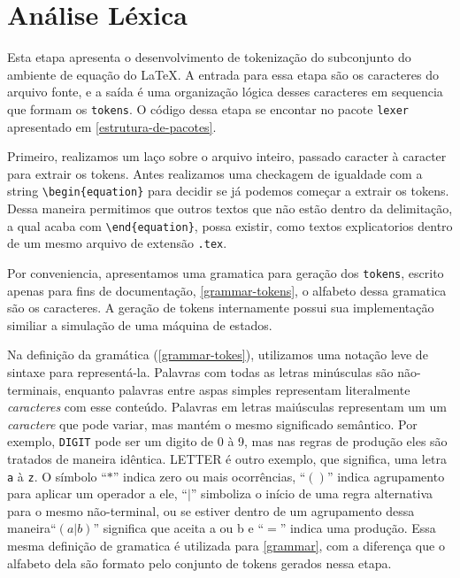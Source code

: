 
\section{Análise Léxica}
Esta etapa apresenta o desenvolvimento de tokenização do subconjunto do ambiente de equação do \LaTeX{}. A entrada para essa etapa são os caracteres do arquivo fonte, e a saída é uma organização lógica desses caracteres em sequencia que formam os \texttt{tokens}. O código dessa etapa se encontar no pacote \texttt{lexer} apresentado em \autoref{estrutura-de-pacotes}.

Primeiro, realizamos um laço sobre o arquivo inteiro, passado caracter à caracter para extrair os tokens. Antes realizamos uma checkagem de igualdade com a string
\verb|\begin{equation}| para decidir se já podemos começar a extrair os tokens. Dessa maneira permitimos que outros textos que não estão dentro da delimitação, a qual acaba com \verb|\end{equation}|, possa existir, como textos explicatorios dentro de um mesmo arquivo de extensão \texttt{.tex}.

Por conveniencia, apresentamos uma gramatica para geração dos \texttt{tokens}, escrito apenas para fins de documentação, \autoref{grammar-tokens}, o alfabeto dessa gramatica são os caracteres.
A geração de tokens internamente possui sua implementação similiar a simulação de uma máquina de estados.

Na definição da gramática (\autoref{grammar-tokes}), utilizamos uma notação leve de sintaxe para representá-la. Palavras com todas as letras minúsculas são não-terminais, enquanto palavras entre aspas simples representam literalmente \textit{caracteres} com esse conteúdo. Palavras em letras maiúsculas representam um um \textit{caractere} que pode variar, mas mantém o mesmo significado semântico. Por exemplo, \texttt{DIGIT} pode ser um digito de 0 à 9, mas nas regras de produção eles são tratados de maneira idêntica. LETTER é outro exemplo, que significa, uma letra \verb"a" à \verb"z". O símbolo ``$*$'' indica zero ou mais ocorrências, ``$()$'' indica agrupamento para aplicar um operador a ele, ``$|$'' simboliza o início de uma regra alternativa para o mesmo não-terminal, ou se estiver dentro de um agrupamento dessa maneira``$(a|b)$'' significa que aceita a ou b e ``$=$'' indica uma produção. Essa mesma definição de gramatica é utilizada para \autoref{grammar}, com a diferença que o alfabeto dela são formato pelo conjunto de tokens gerados nessa etapa.

